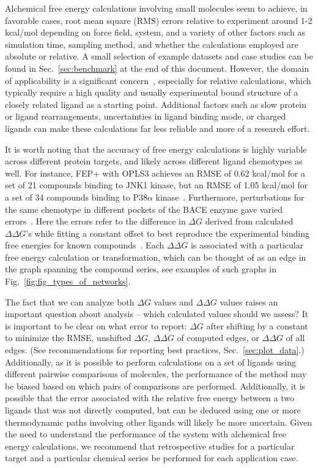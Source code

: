 \documentclass[9pt,bestpractices]{livecoms}
\begin{document}
Alchemical free energy calculations involving small molecules seem to achieve, in favorable cases, root mean square (RMS) errors relative to experiment around 1-2 kcal/mol depending on force field, system, and a variety of other factors such as simulation time, sampling method, and whether the calculations employed are absolute or relative. A small selection of example datasets and case studies can be found in Sec.~\ref{sec:benchmark} at the end of this document.
However, the domain of applicability is a significant concern~\cite{sherborne2016collaborating, cournia2017relative}, especially for relative calculations, which typically require a high quality and usually experimental bound structure of a closely
related ligand as a starting point. Additional factors such as slow protein or ligand rearrangements, uncertainties in ligand binding mode, or charged ligands can make these calculations far less reliable and more of a research effort.


It is worth noting that the accuracy of free energy calculations is highly variable across different protein targets, and likely across different ligand chemotypes as well.
For instance, FEP+ with OPLS3 achieves an RMSE of 0.62 kcal/mol for a set of 21 compounds binding to JNK1 kinase, but an RMSE of 1.05 kcal/mol for a set of 34 compounds binding to P38$\alpha$ kinase~\cite{harder2016opls3}.
Furthermore, perturbations for the same chemotype in different pockets of the BACE enzyme gave varied errors~\cite{keranen2017acylguanidine}. Here the errors refer to the difference in $\Delta G$ derived from calculated $\Delta \Delta G$'s while fitting a constant offset to best reproduce the experimental binding free energies for known compounds~\cite{wang2015accurate}. Each $\Delta \Delta G$ is associated with a particular free energy calculation or transformation, which can be thought of as an edge in the graph spanning the compound series, see examples of such graphs in Fig.~\ref{fig:fig_types_of_networks}.

The fact that we can analyze both $\Delta G$ values and $\Delta \Delta G$ values raises an important question about analysis -- which calculated values should we assess? It is important to be clear on what error to report: $\Delta G$ after shifting by a constant to minimize the RMSE, unshifted $\Delta G$, $\Delta \Delta G$ of computed edges, or $\Delta \Delta G$ of all edges. (See recommendations for reporting best practices, Sec.~\ref{sec:plot_data}.) Additionally, as it is possible to perform calculations on a set of ligands using different pairwise comparisons of molecules, the performance of the method may be biased based on which pairs of comparisons are performed. Additionally, it is possible that the error associated with the relative free energy between a two ligands that was not directly computed,  but can be deduced using one or more thermodynamic paths involving other ligands will likely be more uncertain.
Given the need to understand the performance of the system with alchemical free energy calculations, we recommend that retrospective studies for a particular target and a particular chemical series be performed for each application case.
\end{document}

